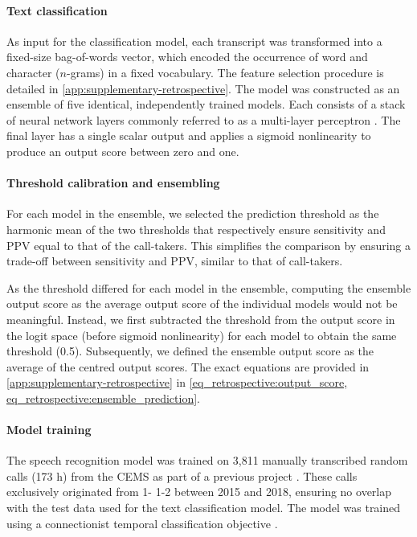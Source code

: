 {\paragraph{Text classification}

As input for the classification model, each transcript was transformed into a fixed-size bag-of-words vector, which encoded the occurrence of word and character ($n$-grams) in a fixed vocabulary. The feature selection procedure is detailed in \cref{app:supplementary-retrospective}. The model was constructed as an ensemble \parencite{hansen_neural_1990} of five identical, independently trained models. Each consists of a stack of neural network layers commonly referred to as a multi-layer perceptron \parencite{rosenblatt_perceptron_1958}. The final layer has a single scalar output and applies a sigmoid nonlinearity to produce an output score between zero and one.


\paragraph{Threshold calibration and ensembling}

For each model in the ensemble, we selected the prediction threshold as the harmonic mean of the two thresholds that respectively ensure sensitivity and PPV equal to that of the call-takers. This simplifies the comparison by ensuring a trade-off between sensitivity and PPV, similar to that of call-takers.

As the threshold differed for each model in the ensemble, computing the ensemble output score as the average output score of the individual models would not be meaningful. Instead, we first subtracted the threshold from the output score in the logit space (before sigmoid nonlinearity) for each model to obtain the same threshold (0.5). Subsequently, we defined the ensemble output score as the average of the centred output scores. The exact equations are provided in \cref{app:supplementary-retrospective} in \cref{eq_retrospective:output_score, eq_retrospective:ensemble_prediction}.


\paragraph{Model training}

The speech recognition model was trained on 3,811 manually transcribed random calls (173 h) from the CEMS as part of a previous project \parencite{cite14}. These calls exclusively originated from 1- 1-2 between 2015 and 2018, ensuring no overlap with the test data used for the text classification model. The model was trained using a connectionist temporal classification objective \parencite{graves_connectionist_2006}.

}
